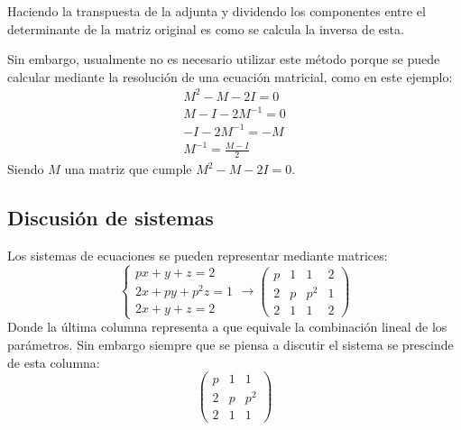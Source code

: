 \documentclass[arial,a4paper,print]{article}
\begin{document}
Haciendo la transpuesta de la adjunta y dividendo los componentes entre el determinante de la matriz original es como se calcula la inversa de esta. 

Sin embargo, usualmente no es necesario utilizar este método porque se puede calcular mediante la resolución de una ecuación matricial, como en este ejemplo:
\begin{align*}
	M^{2} - M -2I = 0\\
	M - I - 2M^{-1} = 0 \\
	- I - 2M^{-1} = - M \\
	M^{-1} = \frac{M-I}{2}
\end{align*}
Siendo $M$ una matriz que cumple $M^{2} - M - 2I = 0$. 


\subsection{Discusión de sistemas}

Los sistemas de ecuaciones se pueden representar mediante matrices: 
\begin{equation*}
	\begin{cases}
		px + y + z = 2\\
		2x + py + p^{2}z = 1\\
		2x + y + z = 2
	\end{cases} \rightarrow \left(\begin{array}{lll|l}
	p & 1 & 1 & 2 \\
	2 & p & p^{2} & 1 \\
	2 & 1 & 1 & 2
\end{array}\right)
\end{equation*}
Donde la última columna representa a que equivale la combinación lineal de los parámetros. Sin embargo siempre que se piensa a discutir el sistema se prescinde de esta columna:
\begin{equation*}
	\left(\begin{array}{lll}
		p & 1 & 1 \\
		2 & p & p^{2} \\
		2 & 1 & 1 
	\end{array}\right)
\end{equation*}
\end{document}
